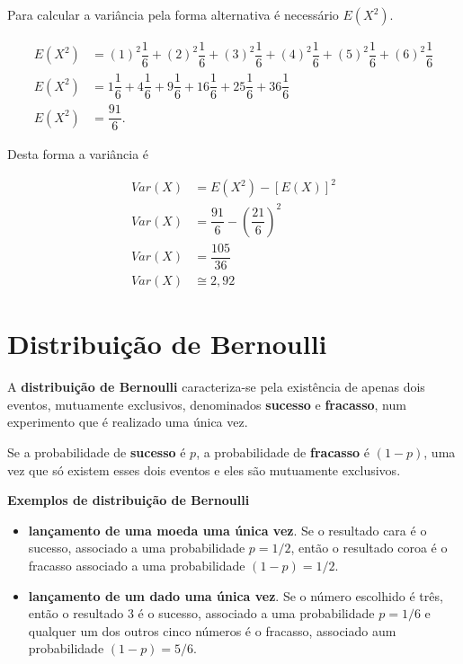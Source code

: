 \documentclass[
]{book}
\begin{document}
Para calcular a variância pela forma alternativa é necessário \(E(X^2)\).

\begin{align}
  E(X^2) &= (1)^2\dfrac{1}{6} + (2)^2\dfrac{1}{6} + (3)^2\dfrac{1}{6} + (4)^2\dfrac{1}{6} + (5)^2\dfrac{1}{6} + (6)^2\dfrac{1}{6} \\
  E(X^2) &= 1\dfrac{1}{6} + 4\dfrac{1}{6} + 9\dfrac{1}{6} + 16\dfrac{1}{6} + 25\dfrac{1}{6} + 36\dfrac{1}{6} \\
  E(X^2) &=\dfrac{91}{6}.
\end{align}

Desta forma a variância é

\begin{align}
  Var(X) &= E(X^2) - [E(X)]^2\\
  Var(X) &= \dfrac{91}{6} - \left( \dfrac{21}{6} \right)^2\\
  Var(X) &= \dfrac{105}{36}\\
  Var(X) &\cong 2,92 
\end{align}

\hypertarget{distribuiuxe7uxe3o-de-bernoulli}{%
\section{Distribuição de Bernoulli}\label{distribuiuxe7uxe3o-de-bernoulli}}

A \textbf{distribuição de Bernoulli} caracteriza-se pela existência de apenas dois eventos, mutuamente exclusivos, denominados \textbf{sucesso} e \textbf{fracasso}, num experimento que é realizado uma única vez.

Se a probabilidade de \textbf{sucesso} é \(p\), a probabilidade de \textbf{fracasso} é \((1-p)\), uma vez que só existem esses dois eventos e eles são mutuamente exclusivos.

\textbf{Exemplos de distribuição de Bernoulli}

\begin{itemize}
\item
  \textbf{lançamento de uma moeda uma única vez}. Se o resultado cara é o sucesso, associado a uma probabilidade \(p=1/2\), então o resultado coroa é o fracasso associado a uma probabilidade \((1-p)=1/2\).
\item
  \textbf{lançamento de um dado uma única vez}. Se o número escolhido é três, então o resultado 3 é o sucesso, associado a uma probabilidade \(p=1/6\) e qualquer um dos outros cinco números é o fracasso, associado aum probabilidade \((1-p) = 5/6\).
\end{itemize}
\end{document}

